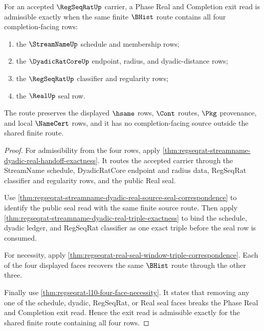 \begin{theorem}
\label{thm:streamname-regseqrat-real-dyadic-completion-face-boundary}
For an accepted $\RegSeqRatUp$ carrier, a Phase Real and Completion exit read is admissible exactly when the same finite $\BHist$ route contains all four completion-facing rows:
\begin{enumerate}
\item the $\StreamNameUp$ schedule and membership rows;
\item the $\DyadicRatCoreUp$ endpoint, radius, and dyadic-distance rows;
\item the $\RegSeqRatUp$ classifier and regularity rows;
\item the $\RealUp$ seal row.
\end{enumerate}
The route preserves the displayed $\hsame$ rows, $\Cont$ routes, $\Pkg$ provenance, and local $\NameCert$ rows, and it has no completion-facing source outside the shared finite route.
\end{theorem}
\begin{proof}
For admissibility from the four rows, apply \autoref{thm:regseqrat-streamname-dyadic-real-handoff-exactness}. It routes the accepted carrier through the StreamName schedule, DyadicRatCore endpoint and radius data, RegSeqRat classifier and regularity rows, and the public Real seal.

Use \autoref{thm:regseqrat-streamname-dyadic-real-source-seal-correspondence} to identify the public seal read with the same finite source route. Then apply \autoref{thm:regseqrat-streamname-dyadic-real-triple-exactness} to bind the schedule, dyadic ledger, and RegSeqRat classifier as one exact triple before the seal row is consumed.

For necessity, apply \autoref{thm:regseqrat-real-seal-window-triple-correspondence}. Each of the four displayed faces recovers the same $\BHist$ route through the other three.

Finally use \autoref{thm:regseqrat-l10-four-face-necessity}. It states that removing any one of the schedule, dyadic, RegSeqRat, or Real seal faces breaks the Phase Real and Completion exit read. Hence the exit read is admissible exactly for the shared finite route containing all four rows.
\end{proof}

